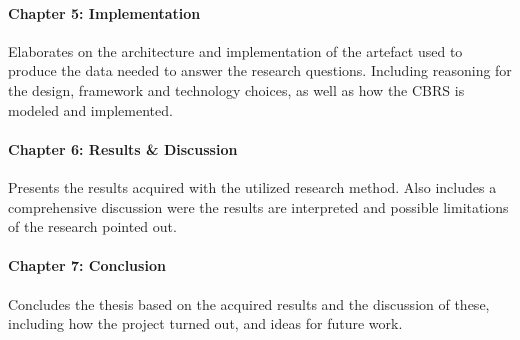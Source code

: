 \paragraph{Chapter 5: Implementation}
Elaborates on the architecture and implementation of the artefact used to produce the data needed to answer the research questions. Including reasoning for the design, framework and technology choices, as well as how the CBRS is modeled and implemented.

\paragraph{Chapter 6: Results \& Discussion}
Presents the results acquired with the utilized research method. Also includes a comprehensive discussion were the results are interpreted and possible limitations of the research pointed out.

\paragraph{Chapter 7: Conclusion}
Concludes the thesis based on the acquired results and the discussion of these, including how the project turned out, and ideas for future work.


\cleardoublepage